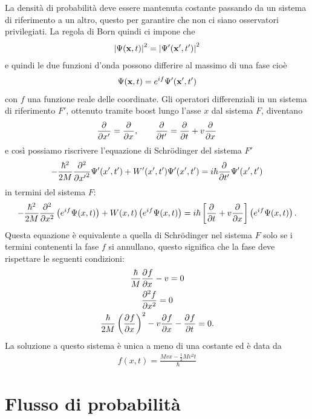 La densità di probabilità deve essere mantenuta costante passando da un sistema di riferimento a un altro, questo per garantire che non ci siano 
osservatori privilegiati. La regola di Born quindi ci impone che 
\begin{align*}
  \abs{\Psi(\v{x}, t)}^2 = \abs{\Psi'(\v{x}', t')}^2
\end{align*}
e quindi le due funzioni d'onda possono differire al massimo di una fase cioè 
\begin{align*}
  \Psi(\v{x}, t) = e^{if} \Psi'(\v{x}', t')
\end{align*}
con $ f $ una funzione reale delle coordinate. Gli operatori differenziali in un sistema di riferimento $ F' $, ottenuto tramite boost lungo l'asse $ x $ 
dal sistema $ F $, diventano 
\begin{align*}
  \der{}{x'} = \der{}{x}, \qquad \der{}{t'} = \der{}{t} + v \der{}{x}
\end{align*}
e così possiamo riscrivere l'equazione di Schrödinger del sistema $ F' $ 
\begin{align*}
  -\frac{\hbar^2}{2M} \der[2]{}{x'} \Psi'(x', t') + W'(x',t') \Psi'(x', t') = i \hbar \der{}{t'} \Psi'(x', t')
\end{align*}
in termini del sistema $ F $:
\begin{align*}
  -\frac{\hbar^2}{2M} \der[2]{}{x} \left( e^{i f} \Psi(x, t) \right) + W(x,t) \left( e^{i f}\Psi(x, t) \right) 
  = i \hbar \left[ \der{}{t} + v \der{}{x} \right] \left( e^{i f} \Psi(x, t) \right).
\end{align*}
Questa equazione è equivalente a quella di Schrödinger nel sistema $ F $ solo se i termini contenenti la fase $ f $ si annullano, questo significa che la 
fase deve rispettare le seguenti condizioni:
\begin{gather}
  \frac{\hbar}{M} \der{f}{x} - v = 0
  \\
  \der[2]{f}{x} = 0
  \\
  \frac{\hbar}{2M} \left( \der{f}{x} \right)^2 - v \der{f}{x} - \der{f}{t} = 0.
\end{gather}
La soluzione a questo sistema è unica a meno di una costante ed è data da 
\begin{align*}
  f(x, t) = \frac{Mvx - \frac12 Mv^2 t}\hbar
\end{align*}


\section{Flusso di probabilità}

